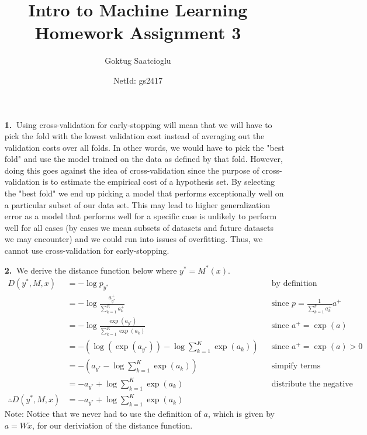 \documentclass [10pt]{article}
\begin{document}
\title{Intro to Machine Learning Homework Assignment 3}
\author{Goktug Saatcioglu}
\date{NetId: gs2417}
\maketitle

\begin{enumerate}
	\item[\textbf{1.$\>$}]Using cross-validation for early-stopping will mean that we will have to pick the fold with the lowest validation cost instead of averaging out the validation costs over all folds. In other words, we would have to pick the "best fold" and use the model trained on the data as defined by that fold. However, doing this goes against the idea of cross-validation since the purpose of cross-validation is to estimate the empirical cost of a hypothesis set. By selecting the "best fold" we end up picking a model that performs exceptionally well on a particular subset of our data set. This may lead to higher generalization error as a model that performs well for a specific case is unlikely to perform well for all cases (by cases we mean subsets of datasets and future datasets we may encounter) and we could run into issues of overfitting. Thus, we cannot use cross-validation for early-stopping.
	\item[\textbf{2.$\>$}]We derive the distance function below where $y^{*} = M^{*}(x)$.
	\begin{align}
		D(y^{*},M,x) &= -\log p_{y^{*}} && \text{by definition} \nonumber \\
		&= -\log \frac{a_{y^{*}}^{+}}{\sum_{k=1}^{K} a_{k}^{+}} && \text{since $p=\frac{1}{\sum_{k=1}^{k} a_{k}^{+}}a^{+}$} \nonumber \\
		&= -\log \frac{\exp(a_{y^{*}})}{\sum_{k=1}^{K} \exp(a_{k})} && \text{since $a^{+}=\exp(a)$} \nonumber \\
		&= -(\log(\exp(a_{y^{*}})) - \log \sum_{k=1}^{K} \exp(a_{k})) && \text{since $a^{+}=\exp(a)>0$} \nonumber \\
		&= -(a_{y^{*}} - \log \sum_{k=1}^{K} \exp(a_{k})) && \text{simpify terms} \nonumber \\
		&= -a_{y^{*}} + \log \sum_{k=1}^{K} \exp(a_{k}) && \text{distribute the negative} \nonumber \\
		\therefore D(y^{*},M,x) &= -a_{y^{*}} + \log \sum_{k=1}^{K} \exp(a_{k}) \nonumber
	\end{align}
	Note: Notice that we never had to use the definition of $a$, which is given by $a = W\tilde{x}$, for our deriviation of the distance function.

\end{enumerate}
\end{document}
